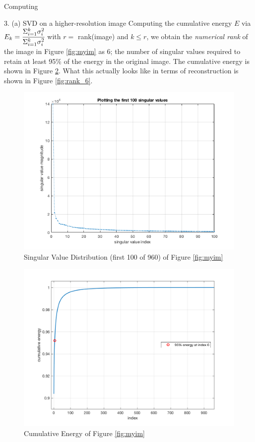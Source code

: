 \begin{section}{Computing}
\begin{homeworkSection}{3. (a) SVD on a higher-resolution image}
Computing the cumulative energy $E$ via $E_k = \cfrac{\Sigma_{i=1}^{k} \sigma_i^2}{\Sigma_{i=1}^{k} \sigma_i^2}$ with $r=$ rank(image) and $k \leq r$, we obtain the \textit{numerical rank} of the image in Figure \ref{fig:myim} as 6; the number of singular values required to retain at least 95\% of the energy in the original image. The cumulative energy is shown in Figure \ref{fig:energy}. What this actually looks like in terms of reconstruction is shown in Figure \ref{fig:rank_6}.

\begin{figure}[H]
\centering
\includegraphics[width=0.75\columnwidth]{../data/SVD_dist}
\caption{Singular Value Distribution (first 100 of 960) of Figure \ref{fig:myim}}
\label{fig:svd_dist}
\end{figure}

\begin{figure}[H]
\centering
\includegraphics[width=0.75\columnwidth]{../data/cumulative_energy}
\caption{Cumulative Energy of Figure \ref{fig:myim}}
\label{fig:energy}
\end{figure}


\end{homeworkSection}
\end{section}
